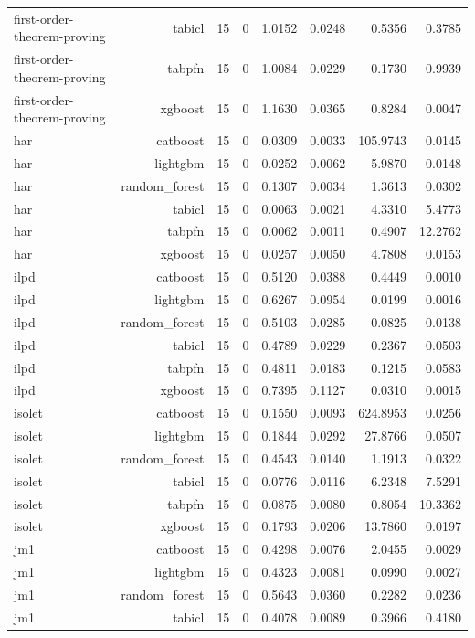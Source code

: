 \begin{table}[htbp]
\begin{tabular}{lrrrrrrr}
first-order-theorem-proving & tabicl & 15 & 0 & 1.0152 & 0.0248 & 0.5356 & 0.3785 \\
first-order-theorem-proving & tabpfn & 15 & 0 & 1.0084 & 0.0229 & 0.1730 & 0.9939 \\
first-order-theorem-proving & xgboost & 15 & 0 & 1.1630 & 0.0365 & 0.8284 & 0.0047 \\
har & catboost & 15 & 0 & 0.0309 & 0.0033 & 105.9743 & 0.0145 \\
har & lightgbm & 15 & 0 & 0.0252 & 0.0062 & 5.9870 & 0.0148 \\
har & random\_forest & 15 & 0 & 0.1307 & 0.0034 & 1.3613 & 0.0302 \\
har & tabicl & 15 & 0 & 0.0063 & 0.0021 & 4.3310 & 5.4773 \\
har & tabpfn & 15 & 0 & 0.0062 & 0.0011 & 0.4907 & 12.2762 \\
har & xgboost & 15 & 0 & 0.0257 & 0.0050 & 4.7808 & 0.0153 \\
ilpd & catboost & 15 & 0 & 0.5120 & 0.0388 & 0.4449 & 0.0010 \\
ilpd & lightgbm & 15 & 0 & 0.6267 & 0.0954 & 0.0199 & 0.0016 \\
ilpd & random\_forest & 15 & 0 & 0.5103 & 0.0285 & 0.0825 & 0.0138 \\
ilpd & tabicl & 15 & 0 & 0.4789 & 0.0229 & 0.2367 & 0.0503 \\
ilpd & tabpfn & 15 & 0 & 0.4811 & 0.0183 & 0.1215 & 0.0583 \\
ilpd & xgboost & 15 & 0 & 0.7395 & 0.1127 & 0.0310 & 0.0015 \\
isolet & catboost & 15 & 0 & 0.1550 & 0.0093 & 624.8953 & 0.0256 \\
isolet & lightgbm & 15 & 0 & 0.1844 & 0.0292 & 27.8766 & 0.0507 \\
isolet & random\_forest & 15 & 0 & 0.4543 & 0.0140 & 1.1913 & 0.0322 \\
isolet & tabicl & 15 & 0 & 0.0776 & 0.0116 & 6.2348 & 7.5291 \\
isolet & tabpfn & 15 & 0 & 0.0875 & 0.0080 & 0.8054 & 10.3362 \\
isolet & xgboost & 15 & 0 & 0.1793 & 0.0206 & 13.7860 & 0.0197 \\
jm1 & catboost & 15 & 0 & 0.4298 & 0.0076 & 2.0455 & 0.0029 \\
jm1 & lightgbm & 15 & 0 & 0.4323 & 0.0081 & 0.0990 & 0.0027 \\
jm1 & random\_forest & 15 & 0 & 0.5643 & 0.0360 & 0.2282 & 0.0236 \\
jm1 & tabicl & 15 & 0 & 0.4078 & 0.0089 & 0.3966 & 0.4180 \\

\end{tabular}
\end{table}
